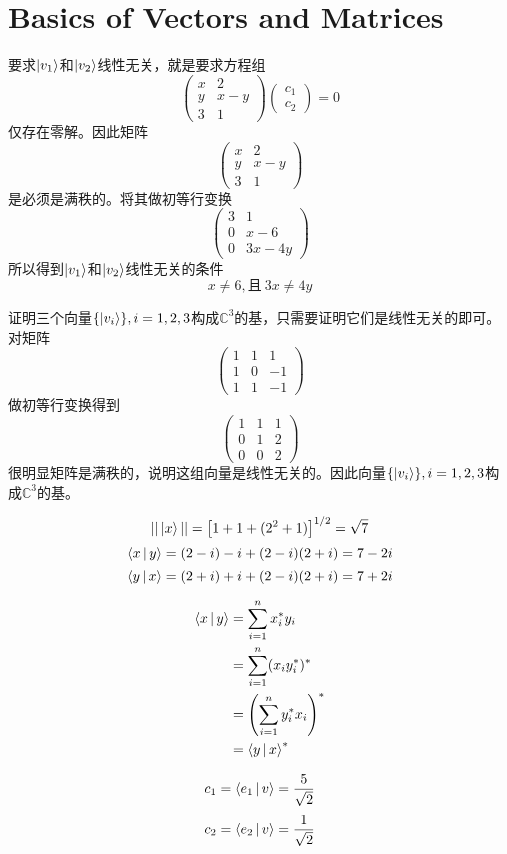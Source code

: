 \section{Basics of Vectors and Matrices}
\exercise

要求$\ket{v_1}$和$\ket{v_2}$线性无关，就是要求方程组
\[
\begin{pmatrix}
x & 2 \\
y & x - y \\
3 & 1
\end{pmatrix}
\begin{pmatrix}
c_1 \\ c_2
\end{pmatrix}
= 0
\]
仅存在零解。因此矩阵
\[
\begin{pmatrix}
x & 2 \\
y & x - y \\
3 & 1
\end{pmatrix}
\]
是必须是满秩的。将其做初等行变换
\[
\begin{pmatrix}
3 & 1 \\
0 & x - 6 \\
0 & 3x - 4y
\end{pmatrix}
\]
所以得到$\ket{v_1}$和$\ket{v_2}$线性无关的条件
\[
x \neq 6, \text{且}\ 3x \neq 4y
\]

\exercise

证明三个向量$\{\ket{v_i}\}, i = 1, 2, 3$构成$\mathbb{C}^3$的基，只需要证明它们是线性无关的即可。对矩阵
\[
\begin{pmatrix}
1 & 1 & 1 \\
1 & 0 & -1 \\
1 & 1 & -1
\end{pmatrix}
\]
做初等行变换得到
\[
\begin{pmatrix}
1 & 1 & 1 \\
0 & 1 & 2 \\
0 & 0 & 2
\end{pmatrix}
\]
很明显矩阵是满秩的，说明这组向量是线性无关的。因此向量$\{\ket{v_i}\}, i = 1, 2, 3$构成$\mathbb{C}^3$的基。

\exercise
\[
||\ket{x}|| = \left[1 + 1 + (2^2 + 1)\right]^{1/2} = \sqrt{7}
\]
\[
\Braket{x|y} = (2 - i) -i + (2 - i)(2 + i) = 7 - 2i
\]
\[
\Braket{y|x} = (2 + i) + i + (2 - i)(2 + i) = 7 + 2i
\]

\exercise
\[
\begin{split}
\Braket{x|y} &= \sum\limits_{i=1}^n x_i^* y_i \\
&= \sum\limits_{i=1}^n (x_i y_i^*)^* \\
&= \left(\sum\limits_{i=1}^n y_i^* x_i \right)^* \\
&= \Braket{y|x}^*
\end{split}
\]

\exercise
\[
c_1 = \Braket{e_1|v} = \frac{5}{\sqrt{2}}
\]
\[
c_2 = \Braket{e_2|v} = \frac{1}{\sqrt{2}}
\]

